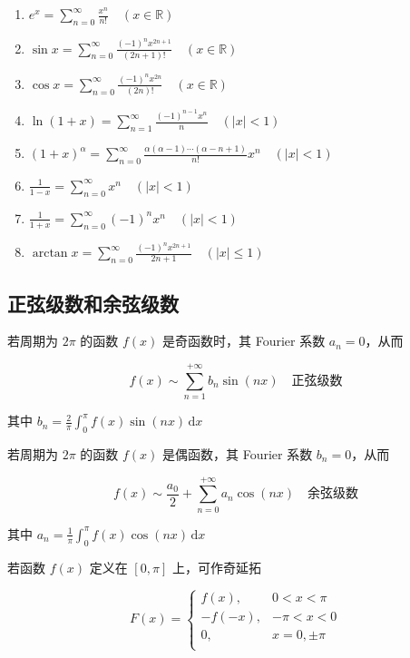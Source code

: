 \documentclass[lang = zh , final , oneside , openany , titlepage , zihao = -4 , linespread = 1.3 , baselineskip = false , cjk-font = windows , text-font = newtx , math-font = newtx , math-style = ISO , uppercase-greek = upright , integral-limits = false]{sjtureport}
\begin{document}
\begin{enumerate}
\item
  \(\displaystyle e^x = \sum_{n=0}^\infty \frac{x^n}{n!} \quad (x\in\mathbb{R})\)
\item
  \(\displaystyle \sin x = \sum_{n=0}^\infty \frac{(-1)^nx^{2n+1}}{(2n+1)!} \quad (x\in\mathbb{R})\)
\item
  \(\displaystyle \cos x = \sum_{n=0}^\infty \frac{(-1)^nx^{2n}}{(2n)!} \quad (x\in\mathbb{R})\)
\item
  \(\displaystyle \ln(1+x) = \sum_{n=1}^\infty \frac{(-1)^{n-1}x^n}{n} \quad (\left\vert x \right\vert<1)\)
\item
  \(\displaystyle (1+x)^\alpha = \sum_{n=0}^\infty \frac{\alpha(\alpha-1)\cdots(\alpha-n+1)}{n!}x^n \quad (\left\vert x\right\vert<1)\)
\item
  \(\displaystyle \frac{1}{1-x} = \sum_{n=0}^\infty x^n \quad (\left\vert x\right\vert<1)\)
\item
  \(\displaystyle \frac{1}{1+x} = \sum_{n=0}^\infty (-1)^nx^n \quad (\left\vert x\right\vert<1)\)
\item
  \(\displaystyle \arctan{x} = \sum_{n=0}^\infty \frac{(-1)^n x^{2n+1}}{2n+1} \quad (\left\vert x\right\vert\leq 1)\)
\end{enumerate}

\subsection{正弦级数和余弦级数}

若周期为 \(2\pi\) 的函数 \(f(x)\) 是奇函数时，其 Fourier 系数
\(a_n=0\)，从而

\[f(x) \sim \sum_{n=1}^{+\infty}b_n\sin(nx)\quad\text{正弦级数}\]

其中
\(\displaystyle b_n =\frac{2}{\pi}\int_0^\pi f(x)\sin(nx) \,\mathrm{d}x\)

若周期为 \(2\pi\) 的函数 \(f(x)\) 是偶函数，其 Fourier 系数
\(b_n=0\)，从而

\[f(x) \sim \frac{a_0}{2}+\sum_{n=0}^{+\infty}a_n\cos(nx)\quad\text{余弦级数}\]

其中
\(\displaystyle a_n =\frac{1}{\pi}\int_0^\pi f(x)\cos(nx) \,\mathrm{d}x\)

若函数 \(f(x)\) 定义在 \([0,\pi]\) 上，可作奇延拓

\[F(x)=\left\{
\begin{aligned}
  f(x),  &0< x< \pi\\
  -f(-x),  &-\pi < x < 0\\
  0, & x=0,\pm\pi\\
\end{aligned}\right.\]
\end{document}
